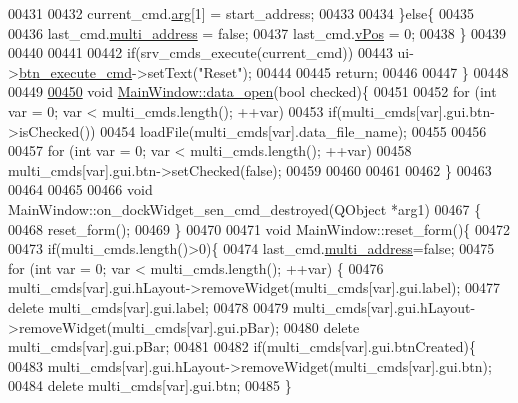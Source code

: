 \begin{DoxyCode}
00431 
00432           current\_cmd.\hyperlink{a00001_a56e6c2d7315d0ae60a51e8b140c9cfe4}{arg}[1] = start\_address;
00433 
00434      \}\textcolor{keywordflow}{else}\{
00435 
00436         last\_cmd.\hyperlink{a00001_a8e69b971c61ced27a7567efd2bf0db59}{multi\_address} = \textcolor{keyword}{false};
00437         last\_cmd.\hyperlink{a00001_a2b48b371fd84be2a8ad581b1ad708b88}{vPos} = 0;
00438      \}
00439 
00440 
00441 
00442        \textcolor{keywordflow}{if}(srv\_cmds\_execute(current\_cmd))
00443           ui->\hyperlink{a00027_a9ea50d44e38316e4203933698cbc14a6}{btn\_execute\_cmd}->setText(\textcolor{stringliteral}{"Reset"});
00444 
00445     \textcolor{keywordflow}{return};
00446 
00447 \}
00448 
00449 
\hypertarget{a00047_source_l00450}{}\hyperlink{a00006_a35b895072769864ac42f8cd732267e4b}{00450} \textcolor{keywordtype}{void} \hyperlink{a00006_a35b895072769864ac42f8cd732267e4b}{MainWindow::data\_open}(\textcolor{keywordtype}{bool} checked)\{
00451 
00452     \textcolor{keywordflow}{for} (\textcolor{keywordtype}{int} var = 0; var < multi\_cmds.length(); ++var)
00453         \textcolor{keywordflow}{if}(multi\_cmds[var].gui.btn->isChecked())
00454             loadFile(multi\_cmds[var].data\_file\_name);
00455 
00456 
00457     \textcolor{keywordflow}{for} (\textcolor{keywordtype}{int} var = 0; var < multi\_cmds.length(); ++var)
00458         multi\_cmds[var].gui.btn->setChecked(\textcolor{keyword}{false});
00459 
00460 
00461 
00462 \}
00463 
00464 
00465 
00466 \textcolor{keywordtype}{void} MainWindow::on\_dockWidget\_sen\_cmd\_destroyed(QObject *arg1)
00467 \{
00468   reset\_form();
00469 \}
00470 
00471 \textcolor{keywordtype}{void} MainWindow::reset\_form()\{
00472 
00473     \textcolor{keywordflow}{if}(multi\_cmds.length()>0)\{
00474         last\_cmd.\hyperlink{a00001_a8e69b971c61ced27a7567efd2bf0db59}{multi\_address}=\textcolor{keyword}{false};
00475         \textcolor{keywordflow}{for} (\textcolor{keywordtype}{int} var = 0; var < multi\_cmds.length(); ++var) \{
00476             multi\_cmds[var].gui.hLayout->removeWidget(multi\_cmds[var].gui.label);
00477             \textcolor{keyword}{delete} multi\_cmds[var].gui.label;
00478 
00479             multi\_cmds[var].gui.hLayout->removeWidget(multi\_cmds[var].gui.pBar);
00480             \textcolor{keyword}{delete} multi\_cmds[var].gui.pBar;
00481 
00482             \textcolor{keywordflow}{if}(multi\_cmds[var].gui.btnCreated)\{
00483             multi\_cmds[var].gui.hLayout->removeWidget(multi\_cmds[var].gui.btn);
00484             \textcolor{keyword}{delete} multi\_cmds[var].gui.btn;
00485             \}

\end{DoxyCode}
